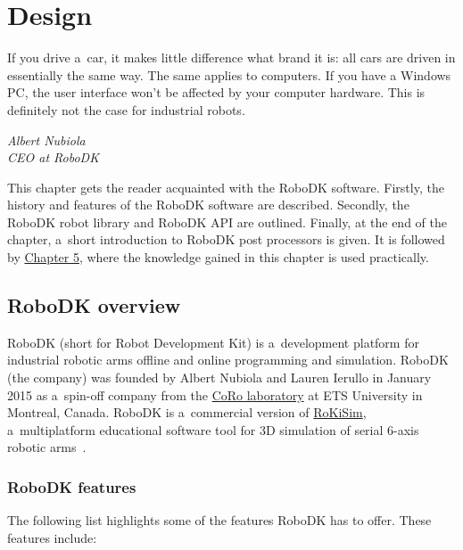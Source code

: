 \chapter{Design \label{chap:design}}



\epigraph{If you drive a~car, it makes little difference what brand it is: all cars are driven
in essentially the same way. The same applies to computers. If you have a
Windows PC, the user interface won’t be affected by your computer hardware.
This is definitely not the case for industrial robots.}{\textit{Albert Nubiola \\ CEO at RoboDK}}

\par This chapter gets the reader acquainted with the RoboDK software. Firstly, the history and features of the RoboDK software are described. Secondly, the RoboDK robot library and RoboDK API are outlined. Finally, at the end of the chapter, a~short introduction to RoboDK post processors is given. It is followed by  \hyperref[chap:implementation]{Chapter 5}, where the knowledge gained in this chapter is used practically. 

\section{RoboDK overview}

RoboDK (short for Robot Development Kit) is a~development platform for industrial robotic arms offline and online programming and simulation. 
RoboDK (the company) was founded by Albert Nubiola and Lauren Ierullo in January 2015 as a~spin-off company from the \href{https://en.etsmtl.ca/unites-de-recherche/coro/accueil?lang=en-CA}{CoRo laboratory}   at ETS University in Montreal, Canada. RoboDK is a~commercial version of \href{https://www.parallemic.org/RoKiSim.html}{RoKiSim}, a~multiplatform educational software tool for 3D simulation of serial 6-axis robotic arms~\cite{robodkoverview}.

\subsection{RoboDK features}

The following list highlights some of the features RoboDK has to offer. These features include: 

